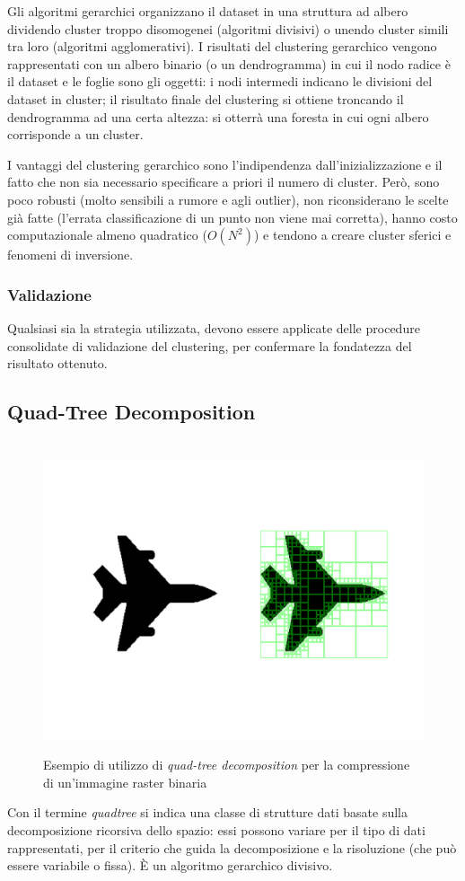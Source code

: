\documentclass[12pt]{report}
\begin{document}
Gli algoritmi gerarchici organizzano il dataset in una struttura ad albero dividendo cluster troppo disomogenei (algoritmi divisivi) o unendo cluster simili tra loro (algoritmi agglomerativi). I risultati del clustering gerarchico vengono rappresentati con un albero binario (o un dendrogramma) in cui il nodo radice è il dataset e le foglie sono gli oggetti: i nodi intermedi indicano le divisioni del dataset in cluster; il risultato finale del clustering si ottiene troncando il dendrogramma ad una certa altezza: si otterrà una foresta in cui ogni albero corrisponde a un cluster.

I vantaggi del clustering gerarchico sono l'indipendenza dall'inizializzazione e il fatto che non sia necessario specificare a priori il numero di cluster. Però, sono poco robusti (molto sensibili a rumore e agli outlier), non riconsiderano le scelte già fatte (l'errata classificazione di un punto non viene mai corretta), hanno costo computazionale almeno quadratico ($O(N^2)$) e tendono a creare cluster sferici e fenomeni di inversione.

\subsubsection{Validazione}
Qualsiasi sia la strategia utilizzata, devono essere applicate delle procedure consolidate di validazione del clustering, per confermare la fondatezza del risultato ottenuto.

\subsection{Quad-Tree Decomposition}
\begin{figure} \centering
	\caption{Esempio di utilizzo di \textit{quad-tree decomposition} per la compressione di un'immagine raster binaria}
	\label{fig:qtdecomp}
	\ \newline 
	\includegraphics[width=\textwidth,trim={1.25in 2.5in 1.25in 2.5in},clip]{../images/qtdecomp.pdf}
\end{figure}
Con il termine \textit{quadtree} si indica una classe di strutture dati basate sulla decomposizione ricorsiva dello spazio: essi possono variare per il tipo di dati rappresentati, per il criterio che guida la decomposizione e la risoluzione (che può essere variabile o fissa). È un algoritmo gerarchico divisivo.
\end{document}
